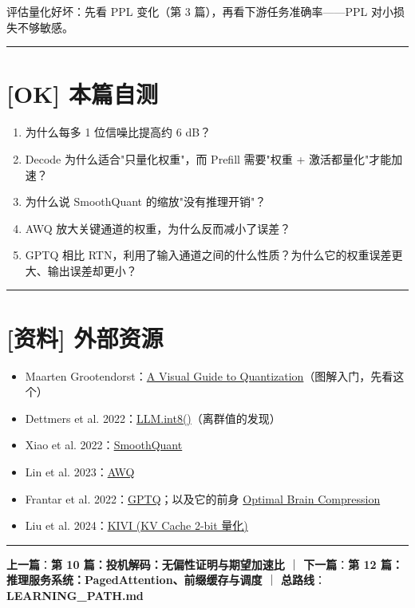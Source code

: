 评估量化好坏：先看 PPL 变化（第 3 篇），再看下游任务准确率——PPL 对小损失不够敏感。

\vspace{0.8em}\hrule\vspace{0.8em}

\section{[OK] 本篇自测}

\begin{enumerate}
  \item 为什么每多 1 位信噪比提高约 6 dB？
  \item Decode 为什么适合"只量化权重"，而 Prefill 需要"权重 + 激活都量化"才能加速？
  \item 为什么说 SmoothQuant 的缩放"没有推理开销"？
  \item AWQ 放大关键通道的权重，为什么反而减小了误差？
  \item GPTQ 相比 RTN，利用了输入通道之间的什么性质？为什么它的权重误差更大、输出误差却更小？
\end{enumerate}

\vspace{0.8em}\hrule\vspace{0.8em}

\section{[资料] 外部资源}

\begin{itemize}
  \item Maarten Grootendorst：\href{https://newsletter.maartengrootendorst.com/p/a-visual-guide-to-quantization}{A Visual Guide to Quantization}（图解入门，先看这个）
  \item Dettmers et al. 2022：\href{https://arxiv.org/abs/2208.07339}{LLM.int8()}（离群值的发现）
  \item Xiao et al. 2022：\href{https://arxiv.org/abs/2211.10438}{SmoothQuant}
  \item Lin et al. 2023：\href{https://arxiv.org/abs/2306.00978}{AWQ}
  \item Frantar et al. 2022：\href{https://arxiv.org/abs/2210.17323}{GPTQ}；以及它的前身 \href{https://arxiv.org/abs/2208.11580}{Optimal Brain Compression}
  \item Liu et al. 2024：\href{https://arxiv.org/abs/2402.02750}{KIVI (KV Cache 2-bit 量化)}
\end{itemize}

\vspace{0.8em}\hrule\vspace{0.8em}

\textbf{上一篇}：\textbf{第 10 篇：投机解码：无偏性证明与期望加速比} ｜ \textbf{下一篇}：\textbf{第 12 篇：推理服务系统：PagedAttention、前缀缓存与调度} ｜ \textbf{总路线}：\textbf{LEARNING\_PATH.md}
